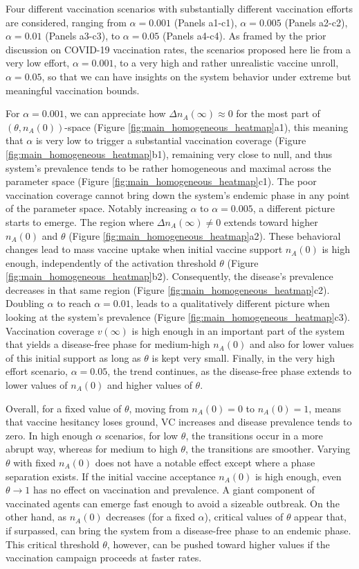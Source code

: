 \documentclass[
 reprint,
 amsmath,amssymb,
 aps,
]{revtex4-2}
\begin{document}
Four different vaccination scenarios with substantially different vaccination efforts are considered, ranging from $\alpha=0.001$ (Panels a1-c1), $\alpha=0.005$ (Panels a2-c2), $\alpha=0.01$ (Panels a3-c3), to $\alpha=0.05$ (Panels a4-c4). As framed by the prior discussion on COVID-19 vaccination rates, the scenarios proposed here lie from a very low effort, $\alpha=0.001$, to a very high and rather unrealistic vaccine unroll, $\alpha=0.05$, so that we can have insights on the system behavior under extreme but meaningful vaccination bounds. 

For $\alpha=0.001$, we can appreciate how $\Delta n_A(\infty)\approx 0$ for the most part of $(\theta,n_A(0))$-space (Figure \ref{fig:main_homogeneous_heatmap}a1), this meaning that $\alpha$ is very low to trigger a substantial vaccination coverage (Figure \ref{fig:main_homogeneous_heatmap}b1), remaining very close to null, and thus system's prevalence tends to be rather homogeneous and maximal across the parameter space (Figure \ref{fig:main_homogeneous_heatmap}c1). The poor vaccination coverage cannot bring down the system's endemic phase in any point of the parameter space. Notably increasing $\alpha$ to $\alpha=0.005$, a different picture starts to emerge. The region where $\Delta n_A(\infty)\neq 0$ extends toward higher $n_A(0)$ and $\theta$ (Figure \ref{fig:main_homogeneous_heatmap}a2). These behavioral changes lead to mass vaccine uptake when initial vaccine support $n_A(0)$ is high enough, independently of the activation threshold $\theta$ (Figure \ref{fig:main_homogeneous_heatmap}b2). Consequently, the disease's prevalence decreases in that same region (Figure \ref{fig:main_homogeneous_heatmap}c2). Doubling $\alpha$ to reach $\alpha=0.01$, leads to a qualitatively different picture when looking at the system's prevalence (Figure \ref{fig:main_homogeneous_heatmap}c3). Vaccination coverage $v(\infty)$ is high enough in an important part of the system that yields a disease-free phase for medium-high $n_A(0)$ and also for lower values of this initial support as long as $\theta$ is kept very small. Finally, in the very high effort scenario, $\alpha=0.05$, the trend continues, as the disease-free phase extends to lower values of $n_A(0)$ and higher values of $\theta$. 

Overall, for a fixed value of $\theta$, moving from $n_A(0)=0$ to $n_A(0)=1$, means that vaccine hesitancy loses ground, VC increases and disease prevalence tends to zero. In high enough $\alpha$ scenarios, for low $\theta$, the transitions occur in a more abrupt way, whereas for medium to high $\theta$, the transitions are smoother. Varying $\theta$ with fixed $n_A(0)$ does not have a notable effect except where a phase separation exists. If the initial vaccine acceptance $n_A(0)$ is high enough, even $\theta\to 1$ has no effect on vaccination and prevalence. A giant component of vaccinated agents can emerge fast enough to avoid a sizeable outbreak. On the other hand, as $n_A(0)$ decreases (for a fixed $\alpha$), critical values of $\theta$ appear that, if surpassed, can bring the system from a disease-free phase to an endemic phase. This critical threshold $\theta$, however, can be pushed toward higher values if the vaccination campaign proceeds at faster rates. 
\end{document}
